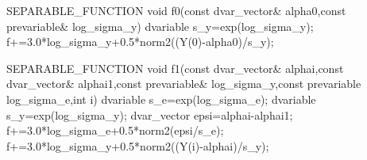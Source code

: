 SEPARABLE_FUNCTION void f0(const dvar_vector& alpha0,const prevariable& log_sigma_y)
  dvariable s_y=exp(log_sigma_y);
  f+=3.0*log_sigma_y+0.5*norm2((Y(0)-alpha0)/s_y);
  
SEPARABLE_FUNCTION void f1(const dvar_vector& alphai,const dvar_vector& alphai1,const prevariable& log_sigma_y,const prevariable log_sigma_e,int i)
  dvariable s_e=exp(log_sigma_e);
  dvariable s_y=exp(log_sigma_y);
  dvar_vector epsi=alphai-alphai1;
  f+=3.0*log_sigma_e+0.5*norm2(epsi/s_e);
  f+=3.0*log_sigma_y+0.5*norm2((Y(i)-alphai)/s_y);

\endexampledf

% 
% 
% 
% 
% 

